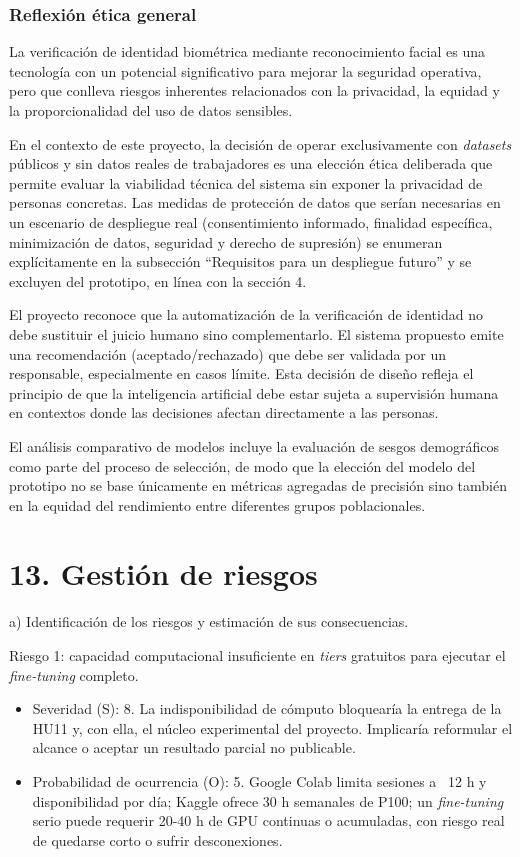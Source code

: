 \documentclass[
  11pt, %
]{charter}
\begin{document}
\subsubsection{Reflexión ética general}

La verificación de identidad biométrica mediante reconocimiento facial es una tecnología con un potencial significativo para mejorar la seguridad operativa, pero que conlleva riesgos inherentes relacionados con la privacidad, la equidad y la proporcionalidad del uso de datos sensibles.

En el contexto de este proyecto, la decisión de operar exclusivamente con \textit{datasets} públicos y sin datos reales de trabajadores es una elección ética deliberada que permite evaluar la viabilidad técnica del sistema sin exponer la privacidad de personas concretas. Las medidas de protección de datos que serían necesarias en un escenario de despliegue real (consentimiento informado, finalidad específica, minimización de datos, seguridad y derecho de supresión) se enumeran explícitamente en la subsección ``Requisitos para un despliegue futuro'' y se excluyen del prototipo, en línea con la sección 4.

El proyecto reconoce que la automatización de la verificación de identidad no debe sustituir el juicio humano sino complementarlo. El sistema propuesto emite una recomendación (aceptado/rechazado) que debe ser validada por un responsable, especialmente en casos límite. Esta decisión de diseño refleja el principio de que la inteligencia artificial debe estar sujeta a supervisión humana en contextos donde las decisiones afectan directamente a las personas.

El análisis comparativo de modelos incluye la evaluación de sesgos demográficos como parte del proceso de selección, de modo que la elección del modelo del prototipo no se base únicamente en métricas agregadas de precisión sino también en la equidad del rendimiento entre diferentes grupos poblacionales.

\section{13. Gestión de riesgos}
\label{sec:riesgos}

a) Identificación de los riesgos y estimación de sus consecuencias.

Riesgo 1: capacidad computacional insuficiente en \textit{tiers} gratuitos para ejecutar el \textit{fine-tuning} completo.

\begin{itemize}
\item Severidad (S): 8. La indisponibilidad de cómputo bloquearía la entrega de la HU11 y, con ella, el núcleo experimental del proyecto. Implicaría reformular el alcance o aceptar un resultado parcial no publicable.
\item Probabilidad de ocurrencia (O): 5. Google Colab limita sesiones a ~12 h y disponibilidad por día; Kaggle ofrece 30 h semanales de P100; un \textit{fine-tuning} serio puede requerir 20-40 h de GPU continuas o acumuladas, con riesgo real de quedarse corto o sufrir desconexiones.
\end{itemize}
\end{document}
